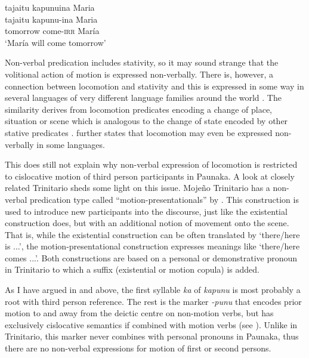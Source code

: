 \ea\label{ex:new23-come}
\begingl
\glpreamble tajaitu kapunuina Maria\\
\gla tajaitu kapunu-ina Maria\\
\glb tomorrow come-\textsc{irr} María\\
\glft ‘María will come tomorrow’
\endgl
\trailingcitation{[jxx-p150920l.009]}
\xe

Non-verbal predication includes stativity, so it may sound strange that the volitional action of motion is expressed non-verbally. There is, however, a connection between locomotion and stativity and this is expressed in some way in several languages of very different language families around the world \citep[]{Payne2008}. The similarity derives from locomotion predicates encoding a change of place, situation or scene which is analogous to the change of state encoded by other stative predicates \citep[249]{Payne2008}. \citet[57, 113]{Payne1997} further states that locomotion may even be expressed non-verbally in some languages.

This does still not explain why non-verbal expression of locomotion is restricted to cislocative motion of third person participants in Paunaka. A look at closely related Trinitario sheds some light on this issue. Mojeño Trinitario has a non-verbal predication type called “motion-presentationals” by \citet[68]{Rose2018a}. This construction is used to introduce new participants into the discourse, just like the existential construction does, but with an additional notion of movement onto the scene. That is, while the existential construction can be often translated by ‘there/here is ...’, the motion-presentational construction expresses meanings like ‘there/here comes ...’. Both constructions are based on a personal or demonstrative pronoun in Trinitario to which a suffix (existential or motion copula) is added. 

As I have argued in  and  above, the first syllable \textit{ka} of \textit{kapunu} is most probably a  root with third person reference. The rest is the  marker \textit{-punu} that encodes prior motion to and away from the deictic centre on non-motion verbs, but has exclusively cislocative semantics if combined with motion verbs (see ). Unlike in Trinitario, this marker never combines with personal pronouns in Paunaka, thus there are no non-verbal expressions for motion of first or second persons.

